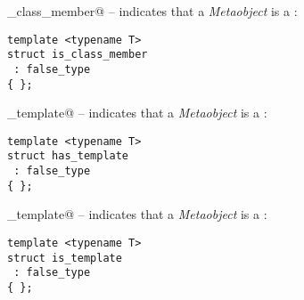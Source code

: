 \verb@is_class_member@ -- indicates that a {\em Metaobject} is a :
\begin{lstlisting}
template <typename T>
struct is_class_member
 : false_type
{ };
\end{lstlisting}

\verb@has_template@ -- indicates that a {\em Metaobject} is a :
\begin{lstlisting}
template <typename T>
struct has_template
 : false_type
{ };
\end{lstlisting}

\verb@is_template@ -- indicates that a {\em Metaobject} is a :
\begin{lstlisting}
template <typename T>
struct is_template
 : false_type
{ };
\end{lstlisting}

